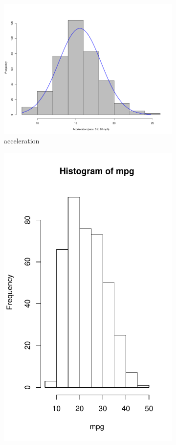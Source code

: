 \documentclass{homework}
\begin{document}
\begin{figure}[h]
\begin{subfigure}[b]{0.3\textwidth}
        \includegraphics[width=\textwidth]{graphs/histAcc.pdf}
        \caption{acceleration}
        \label{fig:HP}
    \end{subfigure}
    \begin{subfigure}[b]{0.3\textwidth}
        \includegraphics[width=\textwidth]{graphs/histmpg.pdf}

\end{subfigure}
\end{figure}
\end{document}
